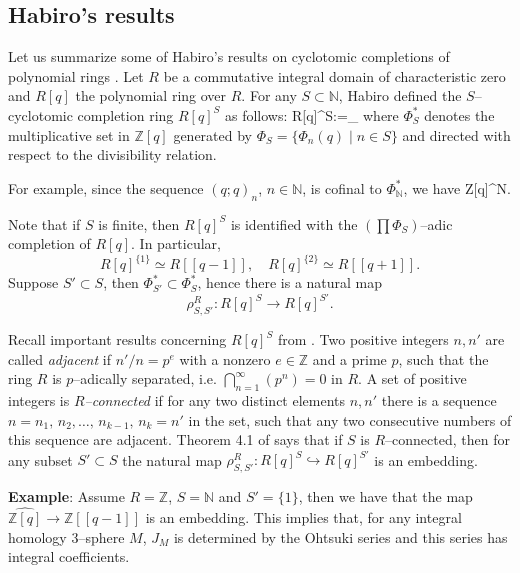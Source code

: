 \documentclass[12pt]{amsart}
\def\be#1\ee{\begin{equation}#1\end{equation}}
\theoremstyle{plain}
\theoremstyle{definition}
\def\BZ{\mathbb Z}
\def\N{{\mathbb N}}
\def\Z{\BZ}
\def\Habiro{\widehat{\Z[q]}}
\begin{document}

\subsection{Habiro's results}  Let us summarize some of Habiro's
results on cyclotomic completions of polynomial rings \cite{Ha1}.
Let  $R$ be a commutative integral domain of characteristic zero
and $R[q]$  the polynomial
ring over $R$.
For any
 $S\subset \N$, Habiro defined  the $S$--cyclotomic completion
 ring $R[q]^S$ as follows:
\be\label{rs} R[q]^S:=\lim_{} \;\; \ee
 where $\Phi^*_S$ denotes the multiplicative
set in $\Z[q]$ generated by $\Phi_S=\{\Phi_n(q)\mid n\in S\}$
  and directed with respect to the
divisibility relation.

For example, since the sequence $(q;q)_n$, $n\in \N$,
 is cofinal to $\Phi^*_\N$, we have
\be\label{cofinal}
\Habiro\simeq\Z[q]^\N.
\ee

 Note that if $S$ is finite, then
$R[q]^S$ is identified with the $(\prod \Phi_S)$--adic completion of $R[q]$.
In particular,
\[
R[q]^{\{1\}}\simeq R[[q-1]], \quad
R[q]^{\{2\}}\simeq R[[q+1]].
\]
Suppose $S' \subset S$, then $\Phi^*_{S'}\subset \Phi^*_S$, hence
there is a natural map
\[
\rho^R_{S, S'}: R[q]^S \to R[q]^{S'}.
\]

Recall important results concerning  $R[q]^S$ from \cite{Ha1}. Two
positive integers $n, n'$ are called {\em adjacent} if
$n'/n=p^e$ with a nonzero
$e\in \Z$ and  a  prime $p$, such that
 the ring $R$ is $p$--adically separated, i.e. $\bigcap_{n=1}^\infty (p^n) =0$ in $R$.
A set of positive integers is
{\em $R$--connected} if for any two distinct elements $n,n'$ there is a
sequence $n=n_1, \,n_2, \dots,\, n_{k-1},\, n_k= n'$ in the set, such that
any two consecutive numbers of this sequence are adjacent.
Theorem 4.1 of \cite{Ha1}
says that if $S$ is $R$--connected,
 then for any subset $S'\subset S$
the natural map $ \rho^R_{S,S'}: R[q]^S \hookrightarrow R[q]^{S'}$ is an
embedding.


\vskip2mm
\noindent
{\bf Example}: Assume $R=\Z$, $S=\N$ and $S'=\{1\}$, then
we have that the map
$\Habiro \to \Z[[q-1]]$ is an embedding. This implies that,
for any integral homology 3--sphere $M$,
$J_M$ is determined by the Ohtsuki series and this series has
integral coefficients.
\vskip2mm
\end{document}
